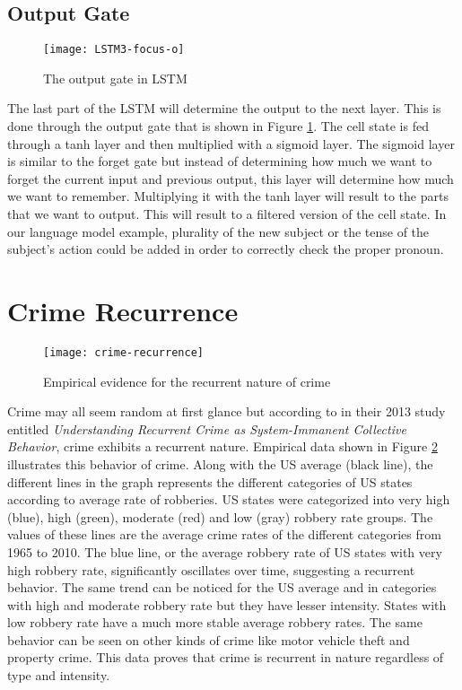     \subsection{Output Gate}
        \begin{figure}[H]
        \centering
        \texttt{[image: LSTM3-focus-o]}
        \caption{The output gate in LSTM \citep{olah2015understanding}}
        \label{fig:lstm-output-gate}
        \end{figure}
        The last part of the LSTM will determine the output to the next layer. This is done through the output gate that is shown in Figure \ref{fig:lstm-output-gate}. The cell state is fed through a tanh layer and then multiplied with a sigmoid layer. The sigmoid layer is similar to the forget gate but instead of determining how much we want to forget the current input and previous output, this layer will determine how much we want to remember. Multiplying it with the tanh layer will result to the parts that we want to output. This will result to a filtered version of the cell state. In our language model example, plurality of the new subject or the tense of the subject's action could be added in order to correctly check the proper pronoun.

\section{Crime Recurrence}
    \begin{figure}[H]
        \centering
        \texttt{[image: crime-recurrence]}
        \caption{Empirical evidence for the recurrent nature of crime \citep{perc2013understanding}}
        \label{fig:crime-recurrence}
    \end{figure}
    Crime may all seem random at first glance but according to \cite{perc2013understanding} in their 2013 study entitled \textit{Understanding Recurrent Crime as System-Immanent Collective Behavior}, crime exhibits a recurrent nature. Empirical data shown in Figure \ref{fig:crime-recurrence} illustrates this behavior of crime. Along with the US average (black line), the different lines in the graph represents the different categories of US states according to average rate of robberies. US states were categorized into very high (blue), high (green), moderate (red) and low (gray) robbery rate groups. The values of these lines are the average crime rates of the different categories from 1965 to 2010. The blue line, or the average robbery rate of US states with very high robbery rate, significantly oscillates over time, suggesting a recurrent behavior. The same trend can be noticed for the US average and in categories with high and moderate robbery rate but they have lesser intensity. States with low robbery rate have a much more stable average robbery rates. The same behavior can be seen on other kinds of crime like motor vehicle theft and property crime. This data proves that crime is recurrent in nature regardless of type and intensity.